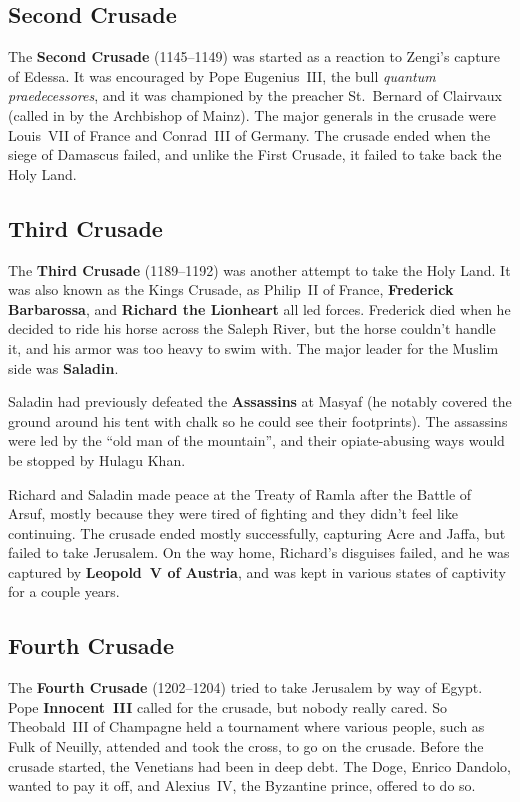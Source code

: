 \subsection*{Second Crusade}

The \textbf{Second Crusade} (1145--1149) was started as a reaction to Zengi's capture of Edessa.
It was encouraged by Pope Eugenius~III\@, the bull \textit{quantum praedecessores},
and it was championed by the preacher St.\ Bernard of Clairvaux (called in by the Archbishop of Mainz).
The major generals in the crusade were Louis~VII of France and Conrad~III of Germany.
The crusade ended when the siege of Damascus failed, and unlike the First Crusade,
it failed to take back the Holy Land.

\subsection*{Third Crusade}

The \textbf{Third Crusade} (1189--1192) was another attempt to take the Holy Land.
It was also known as the Kings Crusade,
as Philip~II of France, \textbf{Frederick Barbarossa}, and \textbf{Richard the Lionheart} all led forces.
Frederick died when he decided to ride his horse across the Saleph River,
but the horse couldn't handle it, and his armor was too heavy to swim with.
The major leader for the Muslim side was \textbf{Saladin}.

Saladin had previously defeated the \textbf{Assassins} at Masyaf
(he notably covered the ground around his tent with chalk so he could see their footprints).
The assassins were led by the ``old man of the mountain'',
and their opiate-abusing ways would be stopped by Hulagu Khan.

Richard and Saladin made peace at the Treaty of Ramla after the Battle of Arsuf,
mostly because they were tired of fighting and they didn't feel like continuing.
The crusade ended mostly successfully, capturing Acre and Jaffa, but failed to take Jerusalem.
On the way home, Richard's disguises failed, and he was captured by \textbf{Leopold~V of Austria},
and was kept in various states of captivity for a couple years.

\subsection*{Fourth Crusade}

The \textbf{Fourth Crusade} (1202--1204) tried to take Jerusalem by way of Egypt.
Pope \textbf{Innocent~III} called for the crusade, but nobody really cared.
So Theobald~III of Champagne held a tournament where various people, such as Fulk of Neuilly,
attended and took the cross, to go on the crusade.
Before the crusade started, the Venetians had been in deep debt.
The Doge, Enrico Dandolo, wanted to pay it off, and Alexius~IV, the Byzantine prince, offered to do so.

